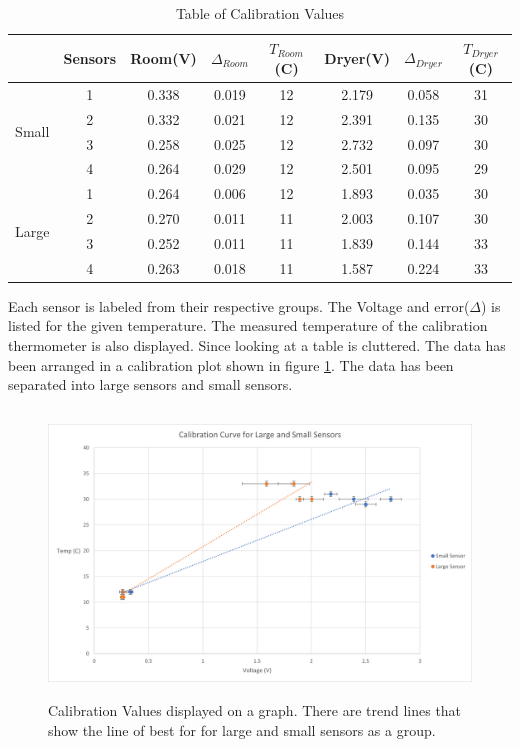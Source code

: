 \documentclass[12pt,a4paper]{report}
\begin{document}
\begin{table}[h!]
    \centering
    \caption{Table of Calibration Values}
    \label{tab:CalibrationTable}
    \begin{tabular}{|c|c|c|c|c|c|c|c|}
        \hline
        & Sensors & Room(V) & $\Delta_{Room}$ & $T_{Room}$(C) & Dryer(V) & $\Delta_{Dryer}$ & $T_{Dryer}$(C)   \\
        \hline
        \multirow{4}{*}{Small} & 1 & 0.338 & 0.019 & 12 & 2.179 & 0.058 & 31 \\
        & 2 & 0.332 & 0.021 & 12 & 2.391 & 0.135 & 30 \\
        & 3 & 0.258 & 0.025 & 12 & 2.732 & 0.097 & 30 \\
        & 4 & 0.264 & 0.029 & 12 & 2.501 & 0.095 & 29 \\
        \hline
        \multirow{4}{*}{Large}& 1 & 0.264 & 0.006 & 12 & 1.893 & 0.035 & 30 \\
        & 2 & 0.270 & 0.011 & 11 & 2.003 & 0.107 & 30 \\
        & 3 & 0.252 & 0.011 & 11 & 1.839 & 0.144 & 33 \\
        & 4 & 0.263 & 0.018 & 11 & 1.587 & 0.224 & 33 \\
        \hline
    \end{tabular}
\end{table}

Each sensor is labeled from their respective groups. The Voltage and error($\Delta$) is listed for the given temperature. The measured temperature of the calibration thermometer is also displayed. Since looking at a table is cluttered. The data has been arranged in a calibration plot shown in figure \ref{fig:CalibrationPlot}. The data has been separated into large sensors and small sensors.

\begin{figure}[h!]
    \centering
    \includegraphics[height = 3in]{Images/Calibration Curve.png}
    \caption{Calibration Values displayed on a graph. There are trend lines that show the line of best for for large and small sensors as a group.}
    \label{fig:CalibrationPlot}
\end{figure}
\end{document}
